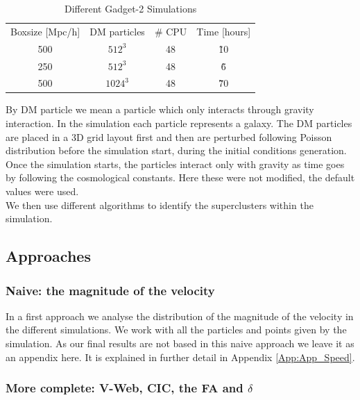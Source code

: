 \documentclass[12pt]{article}
\begin{document}
\begin{table}[ht]
    \centering
    \begin{tabular}{|c|c|c|c|}
        Boxsize [Mpc/h] & DM particles & \# CPU & Time [hours] \\
        500 & $512^{3}$ & 48 & \~ 10 \\
        250 & $512^{3}$ & 48 & \~ 6  \\
        500 & $1024^{3}$ & 48 & \~ 70  \\
    \end{tabular}
    \caption{Different Gadget-2 Simulations}
    \label{tab:sims}
\end{table}
\FloatBarrier

By DM particle we mean a particle which only
 interacts through gravity
interaction. In the simulation each particle
 represents a galaxy. The DM particles are
placed in a 3D grid layout first and then are
 perturbed following Poisson distribution
before the simulation start, during the initial
 conditions generation.\\

Once the simulation starts, the particles interact
 only with gravity as time goes by following the
  cosmological constants. Here these were not
   modified, the default values were used.\\

We then use different algorithms to identify the
 superclusters within the simulation.\\

\subsection{Approaches}

\subsubsection{Naive: the magnitude of the velocity}
\label{sec:naive_speed}
\begin{par}
In a first approach we analyse the distribution of
 the magnitude of the velocity in the different
  simulations. We work with all the particles and
   points given by the simulation. As our final
    results are not based in this naive approach
     we leave it as an appendix here. It is
      explained in further detail in Appendix
       \ref{App:App_Speed}.
\end{par}

\subsubsection{More complete: V-Web, CIC, the FA and $\delta$}
\end{document}
